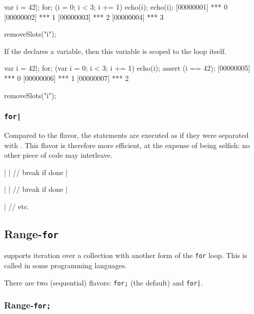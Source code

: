 \begin{urbiscript}
var i = 42|;
for; (i = 0; i < 3; i += 1)
  echo(i);
echo(i);
[00000001] *** 0
[00000002] *** 1
[00000003] *** 2
[00000004] *** 3
\end{urbiscript}
\begin{urbicomment}
removeSlots("i");
\end{urbicomment}


If the  declares a variable, then this variable is
scoped to the loop itself.
\begin{urbiscript}
var i = 42|;
for; (var i = 0; i < 3; i += 1)
  echo(i);
assert (i == 42);
[00000005] *** 0
[00000006] *** 1
[00000007] *** 2
\end{urbiscript}
\begin{urbicomment}
removeSlots("i");
\end{urbicomment}


\subsubsection{\lstinline{for|}}
\label{sec:lang:forc:pipe}
Compared to the \samp{;} flavor, the statements are executed as if they were
separated with \samp{|}.  This flavor is therefore more efficient, at the
expense of being selfish: no other piece of code may interleave.

\begin{urbiunchecked}
|
|      // break if done
|

|
|      // break if done
|

|
// etc.
\end{urbiunchecked}

\subsection{Range-\lstinline{for}}
\label{sec:lang:foreach}

\us supports iteration over a collection with another form of the
\lstinline{for} loop.  This is called  in some
programming languages.


There are two (sequential) flavors: \lstinline{for;} (the default) and
\lstinline{for|}.

\subsubsection{Range-\lstinline{for;}}
\label{sec:lang:foreach:semi}

